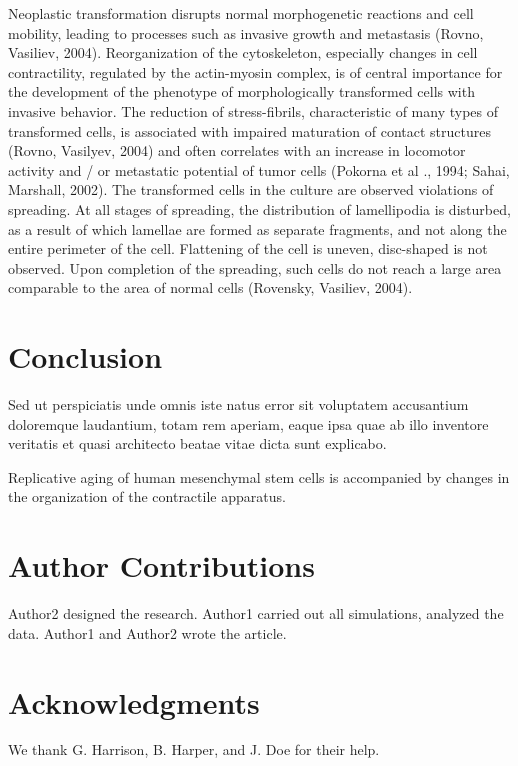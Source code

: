 \documentclass[a4paper,12pt]{article}
\begin{document}
Neoplastic transformation disrupts normal morphogenetic reactions and cell mobility, leading to processes such as invasive growth and metastasis (Rovno, Vasiliev, 2004). Reorganization of the cytoskeleton, especially changes in cell contractility, regulated by the actin-myosin complex, is of central importance for the development of the phenotype of morphologically transformed cells with invasive behavior. The reduction of stress-fibrils, characteristic of many types of transformed cells, is associated with impaired maturation of contact structures (Rovno, Vasilyev, 2004) and often correlates with an increase in locomotor activity and / or metastatic potential of tumor cells (Pokorna et al ., 1994; Sahai, Marshall, 2002). The transformed cells in the culture are observed violations of spreading. At all stages of spreading, the distribution of lamellipodia is disturbed, as a result of which lamellae are formed as separate fragments, and not along the entire perimeter of the cell. Flattening of the cell is uneven, disc-shaped is not observed. Upon completion of the spreading, such cells do not reach a large area comparable to the area of normal cells (Rovensky, Vasiliev, 2004).

\cite{vicente2009non}




\section*{Conclusion}

Sed ut perspiciatis unde omnis iste natus error sit voluptatem accusantium doloremque laudantium, totam rem aperiam, eaque ipsa quae ab illo inventore veritatis et quasi architecto beatae vitae dicta sunt explicabo.

Replicative aging of human mesenchymal stem cells is accompanied by changes in the organization of the contractile apparatus.

\section*{Author Contributions}

Author2 designed the research. Author1 carried out all simulations, analyzed the data. Author1 and Author2 wrote the article.

\section*{Acknowledgments}

We thank G. Harrison, B. Harper, and J. Doe for their help.



\end{document}
